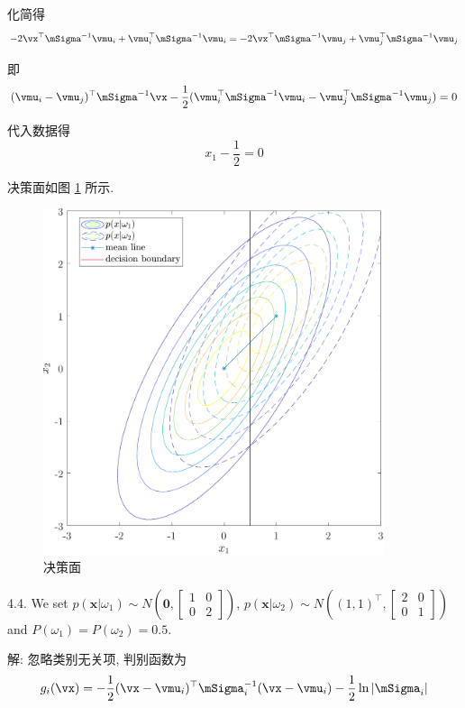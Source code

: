 \documentclass[openany]{ctexbook}
\theoremstyle{kaiti}
\theoremstyle{normal}
\begin{document}
化简得
\begin{equation}
  -2\vx^{\top}\mSigma^{-1}\vmu_i+\vmu_i^{\top}\mSigma^{-1}\vmu_i
  =-2\vx^{\top}\mSigma^{-1}\vmu_j+\vmu_j^{\top}\mSigma^{-1}\vmu_j
\end{equation}

即
\begin{equation}
  (\vmu_i-\vmu_j)^{\top}\mSigma^{-1}\vx-\frac{1}{2}(\vmu_i^{\top}\mSigma^{-1}\vmu_i-\vmu_j^{\top}\mSigma^{-1}\vmu_j)=0
\end{equation}

代入数据得
\begin{equation}
  x_1-\frac{1}{2}=0
\end{equation}

决策面如图 \ref{fig:mvnpdf-3} 所示.

\begin{figure}
  \centering
  \includegraphics[width=10cm]{mvnpdf-3.pdf}
  \caption{决策面}
  \label{fig:mvnpdf-3}
\end{figure}

4.4. We set $p(\bm{x}|\omega_1)\sim N\left(\bm{0},\begin{bmatrix} 1 & 0 \\ 0 & 2 \end{bmatrix}\right)$, $p(\bm{x}|\omega_2)\sim N\left((1,1)^{\top},\begin{bmatrix} 2 & 0 \\ 0 & 1 \end{bmatrix}\right)$ and $P(\omega_1)=P(\omega_2)=0.5$.

解: 忽略类别无关项, 判别函数为
\begin{equation}
  g_i(\vx)=-\frac{1}{2}(\vx-\vmu_i)^{\top}\mSigma_i^{-1}(\vx-\vmu_i)-\frac{1}{2}\ln|\mSigma_i|
\end{equation}
\end{document}
